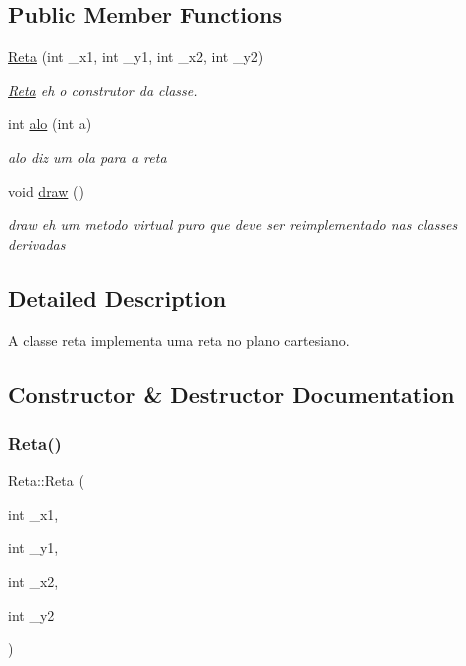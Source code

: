 \subsection*{Public Member Functions}
\begin{DoxyCompactItemize}
\item 
\hyperlink{class_reta_a156d293ea4e42a003eb5f8e55a67bf68}{Reta} (int \+\_\+x1, int \+\_\+y1, int \+\_\+x2, int \+\_\+y2)
\begin{DoxyCompactList}\small\item\em \hyperlink{class_reta}{Reta} eh o construtor da classe. \end{DoxyCompactList}\item 
int \hyperlink{class_reta_a5b05b01be2cf4f21a5f823917bbd3046}{alo} (int a)
\begin{DoxyCompactList}\small\item\em alo diz um ola para a reta \end{DoxyCompactList}\item 
void \hyperlink{class_reta_a1c370279480f421bf617e5fbfbbb63a1}{draw} ()
\begin{DoxyCompactList}\small\item\em draw eh um metodo virtual puro que deve ser reimplementado nas classes derivadas \end{DoxyCompactList}\end{DoxyCompactItemize}


\subsection{Detailed Description}
A classe reta implementa uma reta no plano cartesiano. 

\subsection{Constructor \& Destructor Documentation}
\mbox{\label{class_reta_a156d293ea4e42a003eb5f8e55a67bf68}} 
\subsubsection{\texorpdfstring{Reta()}{Reta()}}
{\footnotesize\ttfamily Reta\+::\+Reta (\begin{DoxyParamCaption}\item[{int}]{\+\_\+x1,  }\item[{int}]{\+\_\+y1,  }\item[{int}]{\+\_\+x2,  }\item[{int}]{\+\_\+y2 }\end{DoxyParamCaption})}



